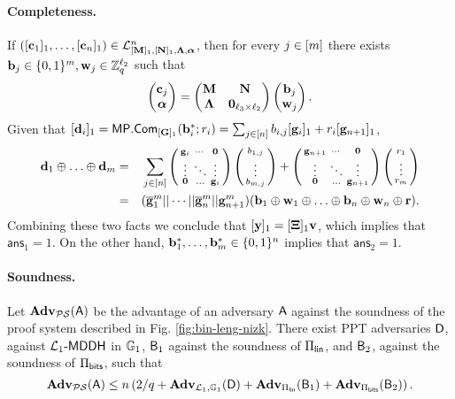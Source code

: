 \paragraph{Completeness.} If $([\mathbf{c}_1]_1,\ldots,
[\mathbf{{c}}_n]_1) \in\mathcal{L}_{[\mathbf{{M}}]_1,[\mathbf{{N}}]_1,\mathbf{{\Lambda}},{\boldsymbol \alpha}}^n$, then for every $j\in[{m}]$ there exists $\mathbf{{b}}_j\in\{0,1\}^{{m}},\mathbf{{w}}_j \in\mathbb{Z}_q^{{\ell_2}}$ such that 
$$
\left(\begin{matrix}
\mathbf{{c}}_j\\
{\boldsymbol \alpha}
\end{matrix}\right)
=
\begin{pmatrix}
\mathbf{{M}}       & \mathbf{{N}}\\
\mathbf{{\Lambda}} & \mathbf{{0}}_{{\ell_3}\times {\ell_2}}
\end{pmatrix}
\left(\begin{matrix}
    \mathbf{{b}}_j\\
    \mathbf{{w}}_j
\end{matrix}\right).
$$
Given that $[\mathbf{{d}}_i]_1 = \mathsf{MP}.\mathsf{Com}_{[\mathbf{{G}}]_1}(\mathbf{b}_i^*;r_i)=\sum_{j\in[n]}b_{i,j}[\mathbf{g}_i]_1+r_i[\mathbf{g}_{n+1}]_1$,
\begin{eqnarray*}
 \mathbf{d}_1\oplus\ldots\oplus\mathbf{d}_{m}
          &=&  {\sum_{j\in[n]}\left(\begin{smallmatrix}\mathbf{g}_i & \cdots & \mathbf{0}\\\vdots & \ddots & \vdots\\\mathbf{0}& \ldots & \mathbf{g}_i\end{smallmatrix}\right)\left(\begin{smallmatrix}b_{1,j}\\\vdots\\b_{{m},j}\end{smallmatrix}\right)+\left(\begin{smallmatrix}\mathbf{g}_{n+1} & \cdots & \mathbf{0}\\\vdots & \ddots & \vdots\\\mathbf{0}& \ldots & \mathbf{g}_{n+1}\end{smallmatrix}\right)\left(\begin{smallmatrix}r_1\\\vdots\\r_{m}\end{smallmatrix}\right)}\\
         &= & (\overline{\mathbf{g}}_1^{m}||\cdots||\overline{\mathbf{g}}_{n}^{m}||\mathbf{g}_{n+1}^{m})(\mathbf{b}_1\oplus\mathbf{w}_1\oplus\ldots\oplus\mathbf{b}_n\oplus\mathbf{w}_n\oplus\mathbf{r}).
\end{eqnarray*}
Combining these two facts we conclude that
$[\mathbf{y}]_1 = [\mathbf{{\Xi}}]_1 \mathbf{v}$, which implies that $\mathsf{ans}_1=1$. On the other hand, $\mathbf{b}_1^*,\ldots,\mathbf{b}_{m}^*\in\{0,1\}^n$ implies that $\mathsf{ans}_2=1$.
  
\paragraph{Soundness.}

\begin{theorem}
Let $\mathbf{Adv}_{\mathcal{PS}}(\mathsf{A})$ be the advantage of an adversary $\mathsf{A}$ against the soundness of the proof system described in Fig. \ref{fig:bin-leng-nizk}. There exist PPT adversaries $\mathsf{D}$, against $\mathcal{L}_1\mbox{-}\mathsf{MDDH}$ in $\mathbb{G}_1$, $\mathsf{B}_1$ against the soundness of $\Pi_{\mathsf{lin}}$, and $\mathsf{B}_2$, against the soundness of $\Pi_{\mathsf{bits}}$, such that
$$
\mathbf{Adv}_{\mathcal{PS}}(\mathsf{A})\leq n\left(2/q + \mathbf{Adv}_{\mathcal{L}_1,\mathbb{G}_1}(\mathsf{D})+\mathbf{Adv}_{\Pi_{\mathsf{lin}}}(\mathsf{B}_1)+\mathbf{Adv}_{\Pi_{\mathsf{bits}}}(\mathsf{B}_2)\right).
$$
\end{theorem}

